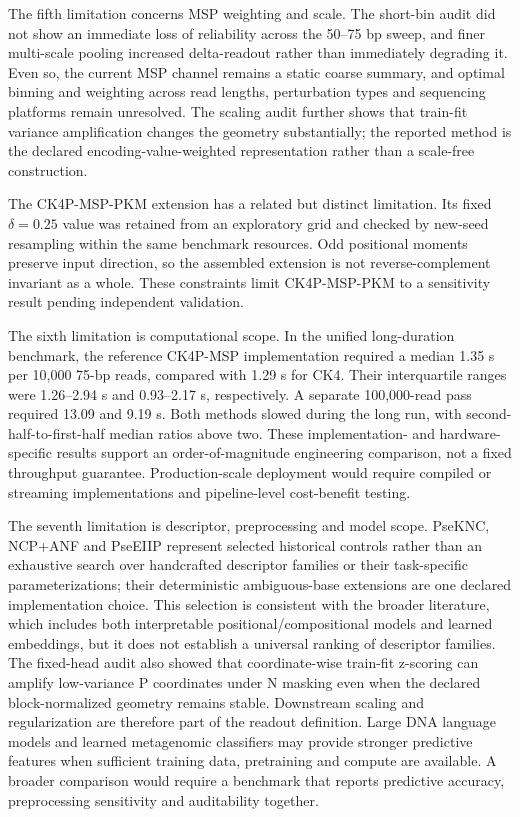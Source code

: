 The fifth limitation concerns MSP weighting and scale. The short-bin audit did not show an immediate loss of reliability across the 50--75 bp sweep, and finer multi-scale pooling increased delta-readout rather than immediately degrading it. Even so, the current MSP channel remains a static coarse summary, and optimal binning and weighting across read lengths, perturbation types and sequencing platforms remain unresolved. The scaling audit further shows that train-fit variance amplification changes the geometry substantially; the reported method is the declared encoding-value-weighted representation rather than a scale-free construction.

The CK4P-MSP-PKM extension has a related but distinct limitation. Its fixed $\delta=0.25$ value was retained from an exploratory grid and checked by new-seed resampling within the same benchmark resources. Odd positional moments preserve input direction, so the assembled extension is not reverse-complement invariant as a whole. These constraints limit CK4P-MSP-PKM to a sensitivity result pending independent validation.

The sixth limitation is computational scope. In the unified long-duration benchmark, the reference CK4P-MSP implementation required a median 1.35 s per 10,000 75-bp reads, compared with 1.29 s for CK4. Their interquartile ranges were 1.26--2.94 s and 0.93--2.17 s, respectively. A separate 100,000-read pass required 13.09 and 9.19 s. Both methods slowed during the long run, with second-half-to-first-half median ratios above two. These implementation- and hardware-specific results support an order-of-magnitude engineering comparison, not a fixed throughput guarantee. Production-scale deployment would require compiled or streaming implementations and pipeline-level cost-benefit testing.

The seventh limitation is descriptor, preprocessing and model scope. PseKNC, NCP+ANF and PseEIIP represent selected historical controls rather than an exhaustive search over handcrafted descriptor families or their task-specific parameterizations; their deterministic ambiguous-base extensions are one declared implementation choice. This selection is consistent with the broader literature, which includes both interpretable positional/compositional models and learned embeddings, but it does not establish a universal ranking of descriptor families. The fixed-head audit also showed that coordinate-wise train-fit z-scoring can amplify low-variance P coordinates under N masking even when the declared block-normalized geometry remains stable. Downstream scaling and regularization are therefore part of the readout definition. Large DNA language models and learned metagenomic classifiers may provide stronger predictive features when sufficient training data, pretraining and compute are available. A broader comparison would require a benchmark that reports predictive accuracy, preprocessing sensitivity and auditability together.

